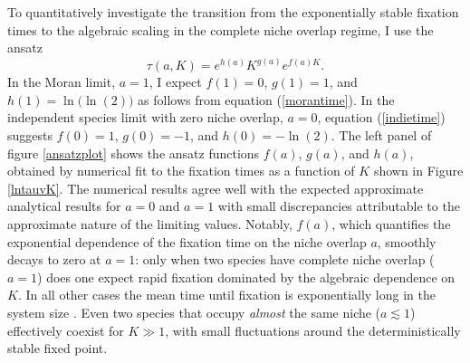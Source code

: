 To quantitatively investigate the transition from the exponentially stable fixation times to the algebraic scaling in the complete niche overlap regime, I use the ansatz
\begin{equation}
\tau(a,K) = e^{h(a)}K^{g(a)}e^{f(a)K}. \label{ansatz}
\end{equation}
In the  Moran limit, $a=1$, I expect $f(1)=0$, $g(1)=1$, and $h(1)=\ln\big(\ln(2)\big)$ as follows from equation (\ref{morantime}). In the independent species limit with zero niche overlap, $a=0$, equation (\ref{indietime}) suggests $f(0)=1$, $g(0)=-1$, and $h(0)=-\ln(2)$. 
The left panel of figure \ref{ansatzplot} shows the ansatz functions $f(a)$, $g(a)$, and $h(a)$, obtained by numerical fit to the fixation times as a function of $K$ shown in Figure \ref{lntauvK}. 
The numerical results agree well with the expected approximate analytical results for $a=0$ and $a=1$ with small discrepancies attributable to the approximate nature of the limiting values. 
Notably, $f(a)$, which quantifies the exponential dependence of the fixation time on the niche overlap $a$, smoothly decays to zero at $a=1$: only when two species have complete niche overlap ($a=1$) does one expect rapid fixation dominated by the algebraic dependence on $K$. 
In all other cases the mean time until fixation is exponentially long in the system size \cite{Hanggi1990,Ovaskainen2010}. 
Even two species that occupy \emph{almost} the same niche ($a\lesssim1$) effectively coexist for $K\gg 1$, with small fluctuations around the deterministically stable fixed point. 



